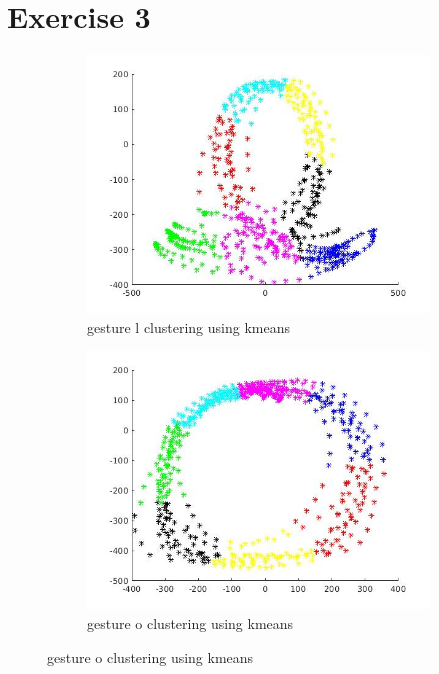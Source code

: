 \documentclass{article}
\begin{document}
\newpage
\section*{Exercise 3}
\begin{figure}[ht]
	\begin{subfigure}{.5\textwidth}
		\centering
		\includegraphics[width=1.\linewidth]{kmean1.jpg}  
		\caption{gesture l clustering using kmeans}
	\end{subfigure}
	\begin{subfigure}{.5\textwidth}
		\centering
		\includegraphics[width=1.\linewidth]{kmean2.jpg}  
		\caption{gesture o clustering using kmeans}
	\end{subfigure}

\end{figure}
\end{document}
